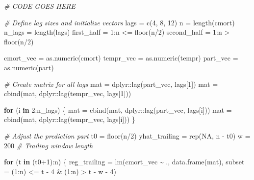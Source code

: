 \documentclass[
]{article}
\newenvironment{Shaded}{\begin{snugshade}}{\end{snugshade}}
\newcommand{\AttributeTok}[1]{\textcolor[rgb]{0.77,0.63,0.00}{#1}}
\newcommand{\CommentTok}[1]{\textcolor[rgb]{0.56,0.35,0.01}{\textit{#1}}}
\newcommand{\ConstantTok}[1]{\textcolor[rgb]{0.00,0.00,0.00}{#1}}
\newcommand{\ControlFlowTok}[1]{\textcolor[rgb]{0.13,0.29,0.53}{\textbf{#1}}}
\newcommand{\DecValTok}[1]{\textcolor[rgb]{0.00,0.00,0.81}{#1}}
\newcommand{\FunctionTok}[1]{\textcolor[rgb]{0.00,0.00,0.00}{#1}}
\newcommand{\NormalTok}[1]{#1}
\newcommand{\OtherTok}[1]{\textcolor[rgb]{0.56,0.35,0.01}{#1}}
\newcommand{\SpecialCharTok}[1]{\textcolor[rgb]{0.00,0.00,0.00}{#1}}
\begin{document}
\begin{Shaded}
\begin{Highlighting}[]
\CommentTok{\# CODE GOES HERE}

\CommentTok{\# Define lag sizes and initialize vectors}
\NormalTok{lags }\OtherTok{=} \FunctionTok{c}\NormalTok{(}\DecValTok{4}\NormalTok{, }\DecValTok{8}\NormalTok{, }\DecValTok{12}\NormalTok{)}
\NormalTok{n }\OtherTok{=} \FunctionTok{length}\NormalTok{(cmort)}
\NormalTok{n\_lags }\OtherTok{=} \FunctionTok{length}\NormalTok{(lags)}
\NormalTok{first\_half }\OtherTok{=} \DecValTok{1}\SpecialCharTok{:}\NormalTok{n }\SpecialCharTok{\textless{}=} \FunctionTok{floor}\NormalTok{(n}\SpecialCharTok{/}\DecValTok{2}\NormalTok{)}
\NormalTok{second\_half }\OtherTok{=} \DecValTok{1}\SpecialCharTok{:}\NormalTok{n }\SpecialCharTok{\textgreater{}} \FunctionTok{floor}\NormalTok{(n}\SpecialCharTok{/}\DecValTok{2}\NormalTok{)}

\NormalTok{cmort\_vec }\OtherTok{=} \FunctionTok{as.numeric}\NormalTok{(cmort)}
\NormalTok{tempr\_vec }\OtherTok{=} \FunctionTok{as.numeric}\NormalTok{(tempr)}
\NormalTok{part\_vec }\OtherTok{=} \FunctionTok{as.numeric}\NormalTok{(part)}

\CommentTok{\# Create matrix for all lags}
\NormalTok{mat }\OtherTok{=}\NormalTok{ dplyr}\SpecialCharTok{::}\FunctionTok{lag}\NormalTok{(part\_vec, lags[}\DecValTok{1}\NormalTok{])}
\NormalTok{mat }\OtherTok{=} \FunctionTok{cbind}\NormalTok{(mat, dplyr}\SpecialCharTok{::}\FunctionTok{lag}\NormalTok{(tempr\_vec, lags[}\DecValTok{1}\NormalTok{]))}

\ControlFlowTok{for}\NormalTok{ (i }\ControlFlowTok{in} \DecValTok{2}\SpecialCharTok{:}\NormalTok{n\_lags) \{}
\NormalTok{  mat }\OtherTok{=} \FunctionTok{cbind}\NormalTok{(mat, dplyr}\SpecialCharTok{::}\FunctionTok{lag}\NormalTok{(part\_vec, lags[i]))}
\NormalTok{  mat }\OtherTok{=} \FunctionTok{cbind}\NormalTok{(mat, dplyr}\SpecialCharTok{::}\FunctionTok{lag}\NormalTok{(tempr\_vec, lags[i]))}
\NormalTok{\}}

\CommentTok{\# Adjust the prediction part}
\NormalTok{t0 }\OtherTok{=} \FunctionTok{floor}\NormalTok{(n}\SpecialCharTok{/}\DecValTok{2}\NormalTok{)}
\NormalTok{yhat\_trailing }\OtherTok{=} \FunctionTok{rep}\NormalTok{(}\ConstantTok{NA}\NormalTok{, n }\SpecialCharTok{{-}}\NormalTok{ t0)}
\NormalTok{w }\OtherTok{=} \DecValTok{200} \CommentTok{\# Trailing window length}

\ControlFlowTok{for}\NormalTok{ (t }\ControlFlowTok{in}\NormalTok{ (t0}\SpecialCharTok{+}\DecValTok{1}\NormalTok{)}\SpecialCharTok{:}\NormalTok{n) \{}
\NormalTok{  reg\_trailing }\OtherTok{=} \FunctionTok{lm}\NormalTok{(cmort\_vec }\SpecialCharTok{\textasciitilde{}}\NormalTok{ .,}
                    \FunctionTok{data.frame}\NormalTok{(mat),}
                    \AttributeTok{subset =}\NormalTok{ (}\DecValTok{1}\SpecialCharTok{:}\NormalTok{n) }\SpecialCharTok{\textless{}=}\NormalTok{ t }\SpecialCharTok{{-}} \DecValTok{4} \SpecialCharTok{\&}\NormalTok{ (}\DecValTok{1}\SpecialCharTok{:}\NormalTok{n) }\SpecialCharTok{\textgreater{}}\NormalTok{ t }\SpecialCharTok{{-}}\NormalTok{ w }\SpecialCharTok{{-}} \DecValTok{4}\NormalTok{)}
  

\end{Highlighting}
\end{Shaded}
\end{document}
